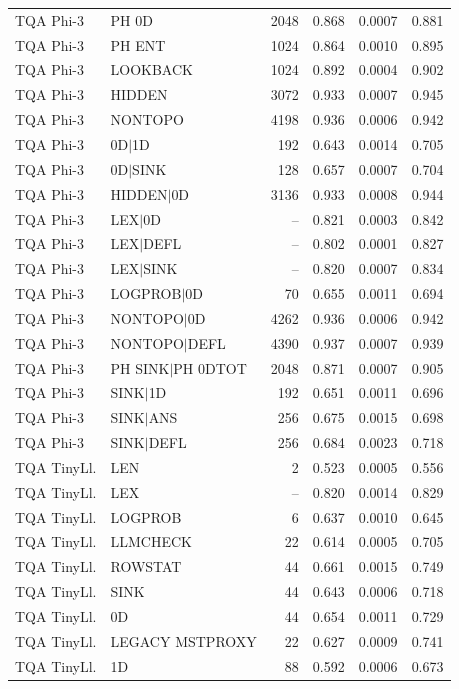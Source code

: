 \begin{longtable}{llrrrr}
TQA Phi-3 & PH 0D & 2048 & 0.868 & 0.0007 & 0.881 \\
TQA Phi-3 & PH ENT & 1024 & 0.864 & 0.0010 & 0.895 \\
TQA Phi-3 & LOOKBACK & 1024 & 0.892 & 0.0004 & 0.902 \\
TQA Phi-3 & HIDDEN & 3072 & 0.933 & 0.0007 & 0.945 \\
TQA Phi-3 & NONTOPO & 4198 & 0.936 & 0.0006 & 0.942 \\
TQA Phi-3 & 0D$\mid$1D & 192 & 0.643 & 0.0014 & 0.705 \\
TQA Phi-3 & 0D$\mid$SINK & 128 & 0.657 & 0.0007 & 0.704 \\
TQA Phi-3 & HIDDEN$\mid$0D & 3136 & 0.933 & 0.0008 & 0.944 \\
TQA Phi-3 & LEX$\mid$0D & -- & 0.821 & 0.0003 & 0.842 \\
TQA Phi-3 & LEX$\mid$DEFL & -- & 0.802 & 0.0001 & 0.827 \\
TQA Phi-3 & LEX$\mid$SINK & -- & 0.820 & 0.0007 & 0.834 \\
TQA Phi-3 & LOGPROB$\mid$0D & 70 & 0.655 & 0.0011 & 0.694 \\
TQA Phi-3 & NONTOPO$\mid$0D & 4262 & 0.936 & 0.0006 & 0.942 \\
TQA Phi-3 & NONTOPO$\mid$DEFL & 4390 & 0.937 & 0.0007 & 0.939 \\
TQA Phi-3 & PH SINK$\mid$PH 0DTOT & 2048 & 0.871 & 0.0007 & 0.905 \\
TQA Phi-3 & SINK$\mid$1D & 192 & 0.651 & 0.0011 & 0.696 \\
TQA Phi-3 & SINK$\mid$ANS & 256 & 0.675 & 0.0015 & 0.698 \\
TQA Phi-3 & SINK$\mid$DEFL & 256 & 0.684 & 0.0023 & 0.718 \\
TQA TinyLl. & LEN & 2 & 0.523 & 0.0005 & 0.556 \\
TQA TinyLl. & LEX & -- & 0.820 & 0.0014 & 0.829 \\
TQA TinyLl. & LOGPROB & 6 & 0.637 & 0.0010 & 0.645 \\
TQA TinyLl. & LLMCHECK & 22 & 0.614 & 0.0005 & 0.705 \\
TQA TinyLl. & ROWSTAT & 44 & 0.661 & 0.0015 & 0.749 \\
TQA TinyLl. & SINK & 44 & 0.643 & 0.0006 & 0.718 \\
TQA TinyLl. & 0D & 44 & 0.654 & 0.0011 & 0.729 \\
TQA TinyLl. & LEGACY MSTPROXY & 22 & 0.627 & 0.0009 & 0.741 \\
TQA TinyLl. & 1D & 88 & 0.592 & 0.0006 & 0.673 \\

\end{longtable}
